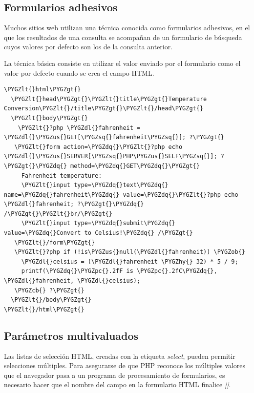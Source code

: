 \documentclass[a5paper,10pt,spanish]{sphinxmanual}
\def\PYGZus{\char`\_}
\def\PYGZob{\char`\{}
\def\PYGZcb{\char`\}}
\def\PYGZlt{\char`\<}
\def\PYGZgt{\char`\>}
\def\PYGZpc{\char`\%}
\def\PYGZdl{\char`\$}
\def\PYGZhy{\char`\-}
\def\PYGZsq{\char`\'}
\def\PYGZdq{\char`\"}
\begin{document}
\subsection{Formularios adhesivos}
\label{Tutorial2_Formularios.md:formularios-adhesivos}
Muchos sitios web utilizan una técnica conocida como formularios
adhesivos, en el que los resultados de una consulta se acompañan de un
formulario de búsqueda cuyos valores por defecto son los de la consulta
anterior.

La técnica básica consiste en utilizar el valor enviado por el
formulario como el valor por defecto cuando se crea el campo HTML.

\begin{Verbatim}[commandchars=\\\{\}]
\PYGZlt{}html\PYGZgt{}
  \PYGZlt{}head\PYGZgt{}\PYGZlt{}title\PYGZgt{}Temperature Conversion\PYGZlt{}/title\PYGZgt{}\PYGZlt{}/head\PYGZgt{}
  \PYGZlt{}body\PYGZgt{}
    \PYGZlt{}?php \PYGZdl{}fahrenheit = \PYGZdl{}\PYGZus{}GET[\PYGZsq{}fahrenheit\PYGZsq{}]; ?\PYGZgt{}
   \PYGZlt{}form action=\PYGZdq{}\PYGZlt{}?php echo \PYGZdl{}\PYGZus{}SERVER[\PYGZsq{}PHP\PYGZus{}SELF\PYGZsq{}]; ?\PYGZgt{}\PYGZdq{} method=\PYGZdq{}GET\PYGZdq{}\PYGZgt{}
     Fahrenheit temperature:
     \PYGZlt{}input type=\PYGZdq{}text\PYGZdq{} name=\PYGZdq{}fahrenheit\PYGZdq{} value=\PYGZdq{}\PYGZlt{}?php echo \PYGZdl{}fahrenheit; ?\PYGZgt{}\PYGZdq{} /\PYGZgt{}\PYGZlt{}br/\PYGZgt{}
     \PYGZlt{}input type=\PYGZdq{}submit\PYGZdq{} value=\PYGZdq{}Convert to Celsius!\PYGZdq{} /\PYGZgt{}
   \PYGZlt{}/form\PYGZgt{}
   \PYGZlt{}?php if (!is\PYGZus{}null(\PYGZdl{}fahrenheit)) \PYGZob{}
     \PYGZdl{}celsius = (\PYGZdl{}fahrenheit \PYGZhy{} 32) * 5 / 9;
     printf(\PYGZdq{}\PYGZpc{}.2fF is \PYGZpc{}.2fC\PYGZdq{}, \PYGZdl{}fahrenheit, \PYGZdl{}celsius);
   \PYGZcb{} ?\PYGZgt{}
  \PYGZlt{}/body\PYGZgt{}
\PYGZlt{}/html\PYGZgt{}
\end{Verbatim}


\subsection{Parámetros multivaluados}
\label{Tutorial2_Formularios.md:parametros-multivaluados}
Las listas de selección HTML, creadas con la etiqueta \emph{select}, pueden
permitir selecciones múltiples. Para asegurarse de que PHP reconoce los
múltiples valores que el navegador pasa a un programa de procesamiento
de formularios, es necesario hacer que el nombre del campo en la
formulario HTML finalice \emph{{[}{]}}.
\end{document}
